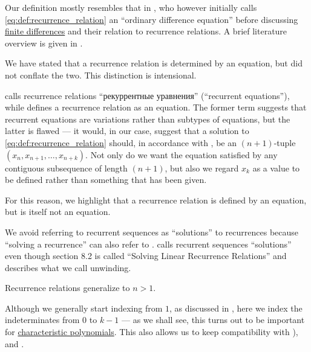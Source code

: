 \begin{comments}
  \item Our definition mostly resembles that in , who however initially calls \eqref{eq:def:recurrence_relation} an \enquote{ordinary difference equation} before discussing \hyperref[def:finite_difference_operator]{finite differences} and their relation to recurrence relations. A brief literature overview is given in .

  \item We have stated that a recurrence relation is determined by an equation, but did not conflate the two. This distinction is intensional.

   calls recurrence relations \enquote{рекуррентные уравнения} (\enquote{recurrent equations}), while  defines a recurrence relation as an equation. The former term suggests that recurrent equations are variations rather than subtypes of equations, but the latter is flawed --- it would, in our case, suggest that a solution to \eqref{eq:def:recurrence_relation} should, in accordance with , be an \( (n + 1) \)-tuple \( (x_n, x_{n+1}, \ldots, x_{n+k}) \). Not only do we want the equation satisfied by any contiguous subsequence of length \( (n + 1) \), but also we regard \( x_k \) as a value to be defined rather than something that has been given.

  For this reason, we highlight that a recurrence relation is defined by an equation, but is itself not an equation.

  \item We avoid referring to recurrent sequences as \enquote{solutions} to recurrences because \enquote{solving a recurrence} can also refer to .  calls recurrent sequences \enquote{solutions} even though section 8.2 is called \enquote{Solving Linear Recurrence Relations} and describes what we call unwinding.

  \item Recurrence relations generalize  to \( n > 1 \).

  \item Although we generally start indexing from \( 1 \), as discussed in , here we index the indeterminates from \( 0 \) to \( k - 1 \) --- as we shall see, this turns out to be important for \hyperref[def:linear_recurrence_characteristic_polynomial]{characteristic polynomials}. This also allows us to keep compatibility with ),  and .


\end{comments}
